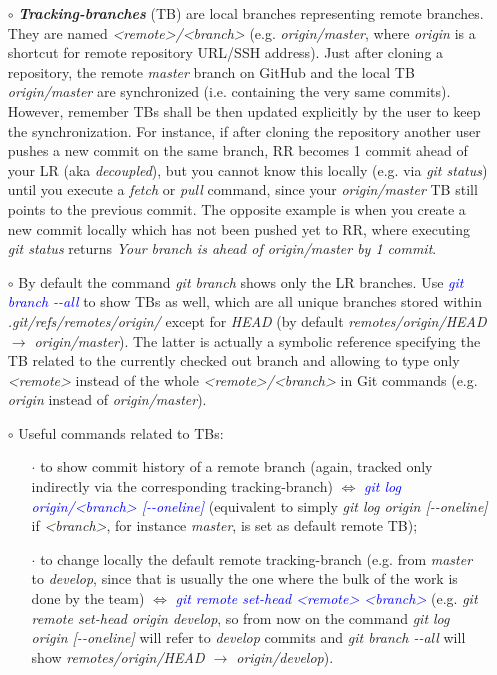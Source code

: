 \documentclass[a4paper,portrait,10pt]{article}   %
\newcommand{\mybulletlvA}{$\circ$}   %
\newcommand{\mybulletlvB}{$\cdot$}   %
\newcommand{\mydiv}{$\Leftrightarrow$ }   %
\newcommand{\mycmd}[1]{\textcolor{blue}{\textit{#1}}}   %
\newcommand{\myvspace}{\vspace{4mm}}   %
\begin{document}
\begin{itemize}
\item[\mybulletlvA] \textbf{\textit{Tracking-branches}} (TB) are local branches representing remote branches. They are named \textit{<remote>/<branch>} (e.g. \textit{origin/master}, where \textit{origin} is a shortcut for remote repository URL/SSH address). Just after cloning a repository, the remote \textit{master} branch on GitHub and the local TB \textit{origin/master} are synchronized (i.e. containing the very same commits). However, remember TBs shall be then updated explicitly by the user to keep the synchronization. For instance, if after cloning the repository another user pushes a new commit on the same branch, RR becomes 1 commit ahead of your LR (aka \textit{decoupled}), but you cannot know this locally (e.g. via \textit{git status}) until you execute a \textit{fetch} or \textit{pull} command, since your \textit{origin/master} TB still points to the previous commit. The opposite example is when you create a new commit locally which has not been pushed yet to RR, where executing \textit{git status} returns \textit{Your branch is ahead of origin/master by 1 commit}.
\myvspace

\item[\mybulletlvA] By default the command \textit{git branch} shows only the LR branches. Use \mycmd{git branch -{}-all} to show TBs as well, which are all unique branches stored within \textit{.git/refs/remotes/origin/} except for \textit{HEAD} (by default \textit{remotes/origin/HEAD $\rightarrow$ origin/master}). The latter is actually a symbolic reference specifying the TB related to the currently checked out branch and allowing to type only \textit{<remote>} instead of the whole \textit{<remote>/<branch>} in Git commands (e.g. \textit{origin} instead of \textit{origin/master}).
\myvspace

\item[\mybulletlvA] Useful commands related to TBs:
\begin{itemize}
  \item[\mybulletlvB] to show commit history of a remote branch (again, tracked only indirectly via the corresponding tracking-branch) \mydiv \mycmd{git log origin/<branch> [-{}-oneline]} (equivalent to simply \textit{git log origin [-{}-oneline]} if \textit{<branch>}, for instance \textit{master}, is set as default remote TB);
  \item[\mybulletlvB] to change locally the default remote tracking-branch (e.g. from \textit{master} to \textit{develop}, since that is usually the one where the bulk of the work is done by the team) \mydiv \mycmd{git remote set-head <remote> <branch>} (e.g. \textit{git remote set-head origin develop}, so from now on the command \textit{git log origin [-{}-oneline]} will refer to \textit{develop} commits and \textit{git branch -{}-all} will show \textit{remotes/origin/HEAD $\rightarrow$ origin/develop}).
\end{itemize}
\myvspace


\end{itemize}
\end{document}
